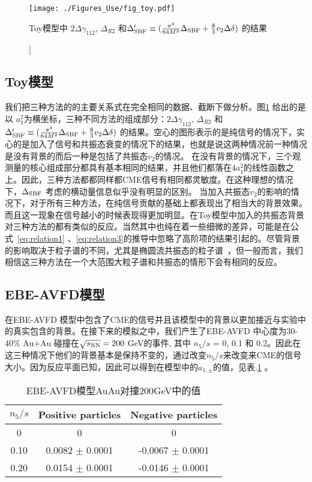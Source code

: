 \begin{figure}[htbp]
\centering
\texttt{[image: ./Figures\_Use/fig\_toy.pdf]}
\caption[三种方法核心组成部分在Toy模型中的结果]]{Toy模型中 $2\Delta\gamma_{112}$, $\Delta_{R2}$ 和$\Delta'_{\rm SBF}\equiv(\frac{\pi^4}{64M^2}\Delta_{\rm SBF}+\frac{8}{3}v_2\Delta\delta)$ 的结果}
\label{fig:toya1}
\end{figure}

\subsection{Toy模型}
我们把三种方法的的主要关系式在完全相同的数据、截断下做分析。图\ref{fig:toya1} 给出的是以 $a_1^2$为横坐标，三种不同方法的组成部分：$2\Delta\gamma_{112}$, $\Delta_{R2}$ 和 $\Delta'_{\rm SBF}\equiv(\frac{\pi^4}{64M^2}\Delta_{\rm SBF}+\frac{8}{3}v_2\Delta\delta)$ 的结果。空心的图形表示的是纯信号的情况下，实心的是加入了信号和共振态衰变的情况下的结果，也就是说这两种情况前一种情况是没有背景的而后一种是包括了共振态$v_2$的情况。
在没有背景的情况下，三个观测量的核心组成部分都具有基本相同的结果，并且他们都落在$4a_1^2$的线性函数之上。因此，三种方法都都同样都CME信号有相同都灵敏度。在这种理想的情况下，$\Delta_{\rm SBF}$ 考虑的横动量信息似乎没有明显的区别。
当加入共振态$v_2$的影响的情况下，对于所有三种方法，在纯信号贡献的基础上都表现出了相当大的背景效果。而且这一现象在信号越小的时候表现得更加明显。在Toy模型中加入的共振态背景对三种方法的都有类似的反应。当然其中也纯在着一些细微的差异，可能是在公式~\ref{eq:relation1} 、\ref{eq:relation3}的推导中忽略了高阶项的结果引起的。尽管背景的影响取决于粒子谱的不同，尤其是椭圆流共振态的粒子谱~\cite{Feng:2018chm,Schlichting:2010qia,Pratt:2010zn}，但一般而言，我们相信这三种方法在一个大范围大粒子谱和共振态的情形下会有相同的反应。


\subsection{EBE-AVFD模型}
在EBE-AVFD 模型中包含了CME的信号并且该模型中的背景以更加接近与实验中的真实包含的背景。在接下来的模拟之中，我们产生了EBE-AVFD 中心度为30-40\% Au+Au 碰撞在$\sqrt{s_{\rm NN}} = 200$ GeV的事件, 其中 $n_{5}/s$ = 0, 0.1 和 0.2。因此在这三种情况下他们的背景基本是保持不变的，通过改变$n_{5}/s$来改变来CME的信号大小。因为反应平面已知，因此可以得到在模型中的$a_{1,\pm}$的值，见表.\ref{tab:Observeda1AuAu} 。
\begin{center}
\begin{table}[h]
\centering
\caption{ EBE-AVFD模型AuAu对撞200GeV中的值}
\begin{tabular}{c|c|c}
\toprule
 $n_{5}/s$    &  Positive particles      &   Negative particles   \\  
\hline
0   &  0 & 0 \\
0.10 &  0.0082   $\pm$ 0.0001   &  -0.0067 $\pm$ 0.0001  \\
0.20 &  0.0154   $\pm$ 0.0001   &  -0.0146 $\pm$ 0.0001  \\
\bottomrule
\end{tabular}
\label{tab:Observeda1AuAu}
\end{table}
\end{center}



